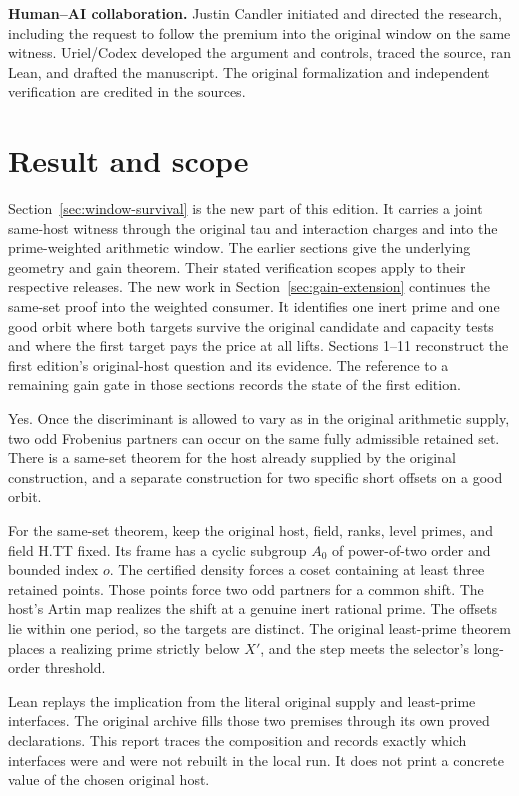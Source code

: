 \documentclass[12pt,letterpaper]{article}
\DeclareRobustCommand{\id}[1]{\mbox{\small\ttfamily #1}}
\begin{document}
\medskip
\textbf{Human--AI collaboration.} Justin Candler initiated and directed the research, including the request to follow the premium into the original window on the same witness. Uriel/Codex developed the argument and controls, traced the source, ran Lean, and drafted the manuscript. The original formalization and independent verification are credited in the sources.
\clearpage
\begingroup\small\setlength{\parskip}{0pt}\tableofcontents\endgroup
\clearpage
{}
\section{Result and scope}
Section~\ref{sec:window-survival} is the new part of this edition. It carries a joint same-host witness through the original tau and interaction charges and into the prime-weighted arithmetic window. The earlier sections give the underlying geometry and gain theorem. Their stated verification scopes apply to their respective releases.
The new work in Section~\ref{sec:gain-extension} continues the same-set proof into the weighted consumer. It identifies one inert prime and one good orbit where both targets survive the original candidate and capacity tests and where the first target pays the price at all lifts. Sections 1--11 reconstruct the first edition's original-host question and its evidence. The reference to a remaining gain gate in those sections records the state of the first edition.
\label{sec:result}

Yes. Once the discriminant is allowed to vary as in the original arithmetic supply, two odd Frobenius partners can occur on the same fully admissible retained set. There is a same-set theorem for the host already supplied by the original construction, and a separate construction for two specific short offsets on a good orbit.

For the same-set theorem, keep the original host, field, ranks, level primes, and field \id{H.TT} fixed. Its frame has a cyclic subgroup \(A_0\) of power-of-two order and bounded index \(o\). The certified density forces a coset containing at least three retained points. Those points force two odd partners for a common shift. The host's Artin map realizes the shift at a genuine inert rational prime. The offsets lie within one period, so the targets are distinct. The original least-prime theorem places a realizing prime strictly below \(X'\), and the step meets the selector's long-order threshold.

Lean replays the implication from the literal original supply and least-prime interfaces. The original archive fills those two premises through its own proved declarations. This report traces the composition and records exactly which interfaces were and were not rebuilt in the local run. It does not print a concrete value of the chosen original host.
\end{document}
